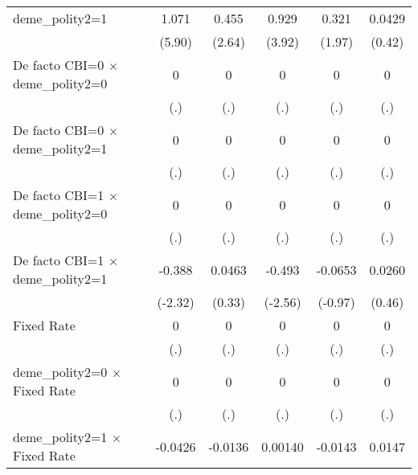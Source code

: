 \begin{table}[htbp]
\begin{tabular}{l*{5}{c}}
deme\_polity2=1                          &    1.071\sym{***}&    0.455\sym{**} &    0.929\sym{***}&    0.321         &   0.0429         \\
                                        &   (5.90)         &   (2.64)         &   (3.92)         &   (1.97)         &   (0.42)         \\
\addlinespace
De facto CBI=0 $\times$ deme\_polity2=0  &        0         &        0         &        0         &        0         &        0         \\
                                        &      (.)         &      (.)         &      (.)         &      (.)         &      (.)         \\
\addlinespace
De facto CBI=0 $\times$ deme\_polity2=1  &        0         &        0         &        0         &        0         &        0         \\
                                        &      (.)         &      (.)         &      (.)         &      (.)         &      (.)         \\
\addlinespace
De facto CBI=1 $\times$ deme\_polity2=0  &        0         &        0         &        0         &        0         &        0         \\
                                        &      (.)         &      (.)         &      (.)         &      (.)         &      (.)         \\
\addlinespace
De facto CBI=1 $\times$ deme\_polity2=1  &   -0.388\sym{*}  &   0.0463         &   -0.493\sym{*}  &  -0.0653         &   0.0260         \\
                                        &  (-2.32)         &   (0.33)         &  (-2.56)         &  (-0.97)         &   (0.46)         \\
\addlinespace
Fixed Rate                              &        0         &        0         &        0         &        0         &        0         \\
                                        &      (.)         &      (.)         &      (.)         &      (.)         &      (.)         \\
\addlinespace
deme\_polity2=0 $\times$ Fixed Rate      &        0         &        0         &        0         &        0         &        0         \\
                                        &      (.)         &      (.)         &      (.)         &      (.)         &      (.)         \\
\addlinespace
deme\_polity2=1 $\times$ Fixed Rate      &  -0.0426\sym{**} &  -0.0136         &  0.00140         &  -0.0143         &   0.0147         \\

\end{tabular}
\end{table}
